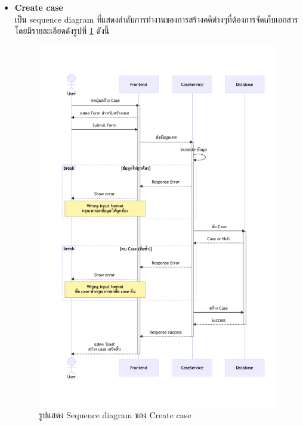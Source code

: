 \documentclass[12pt,oneside,openright,a4paper]{cpe-thai-project}
\begin{document}
\begin{itemize}

    \item \textbf{Create case}\\
    เป็น sequence diagram ที่แสดงลำดับการทำงานของการสร้างคดีต่างๆที่ต้องการจัดเก็บเอกสาร โดยมีรายละเอียดดังรูปที่ \ref{fig:sqCreateCase} ดังนี้
    \begin{figure}[!ht]\centering
        \includegraphics[width=15cm, trim={0 3cm 0 3cm},clip]{./assets/sequence-diagram/create-case.png}
        \caption{รูปแสดง Sequence diagram ของ Create case}\label{fig:sqCreateCase}
    \end{figure}


\end{itemize}
\end{document}

